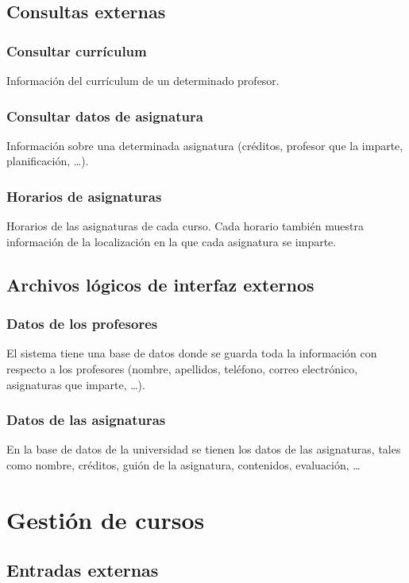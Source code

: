 \documentclass[11pt,a4paper,spanish,twoside]{book}
\begin{document}
\subsection{Consultas externas}
\subsubsection{Consultar currículum}
Información del currículum de un determinado profesor.

\subsubsection{Consultar datos de asignatura} 
Información sobre una determinada asignatura (créditos, profesor que la
imparte, planificación, \dots).

\subsubsection{Horarios de asignaturas}
Horarios de las asignaturas de cada curso. Cada horario
también muestra información de la localización en la que cada asignatura se
imparte. 

\subsection{Archivos lógicos de interfaz externos}
\subsubsection{Datos de los profesores}
El sistema tiene una base de datos donde se guarda toda la información con
respecto a los profesores (nombre, apellidos, teléfono, correo electrónico,
asignaturas que imparte, \dots).

\subsubsection{Datos de las asignaturas}
En la base de datos de la universidad se tienen los datos de las asignaturas,
tales como nombre, créditos, guión de la asignatura, contenidos, evaluación,
\dots 


\section{Gestión de cursos}
\subsection{Entradas externas}
\end{document}
